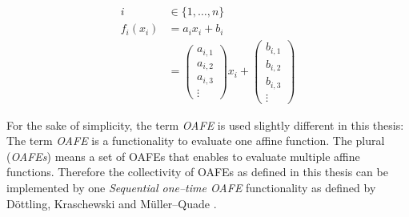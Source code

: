 \begin{align*}
  i &\in \{1, \ldots, n\}\\
%
  f_i(x_i) &=
  a_ix_i + b_i \\
%
  &=
\begin{pmatrix}a_{i,1}\\a_{i,2}\\a_{i,3}\\\vdots\end{pmatrix}x_i +
\begin{pmatrix}b_{i,1}\\b_{i,2}\\b_{i,3}\\\vdots\end{pmatrix}
\end{align*}

\noindent{}For the sake of simplicity, the term \emph{OAFE} is used slightly
different in this thesis: The term \emph{OAFE} is a functionality to evaluate
one affine function. The plural (\emph{OAFEs}) means a set of OAFEs that enables
to evaluate multiple affine functions. Therefore the collectivity of OAFEs as
defined in this thesis can be implemented by one \emph{Sequential one--time
OAFE} functionality as defined by Döttling, Kraschewski and Müller--Quade
\cite{davidgoliath}.


%
%
\label{sec:drav}

